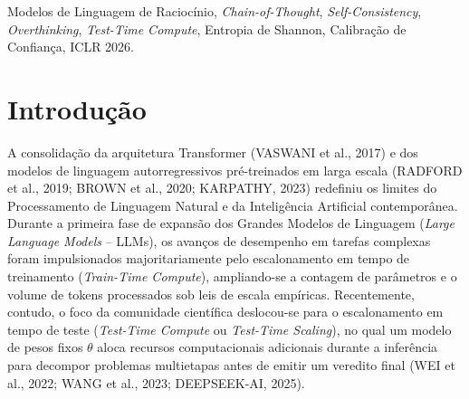 \documentclass[9pt,conference]{IEEEtran}
\begin{document}
\begin{abstract}
\vspace{2pt}
\noindent\textbf{\textit{Abstract}}---\textit{Test-Time Compute scaling via Chain-of-Thought (CoT) prompting and Self-Consistency (SC) voting has become the standard paradigm for enhancing mathematical reasoning in Large Language Models (LLMs). However, recent findings in ICLR 2026 reveal that in Small Language Models (SLMs, 1.5B--3B parameters), excessively long reasoning chains induce ``overthinking,'' where accuracy follows an inverted-U curve with respect to generation length $L$ (WU et al., 2026), driven by over-correction (HAO et al., 2026) and attention dilution (FENG et al., 2026). While calibrated scaling methods such as CaTS (HUANG et al., 2026) adaptively prune the sample budget $N$, they fail to bound intra-trace length $L$ online and suffer from severe miscalibration in long traces. We propose \textbf{Length-Calibrated Self-Consistency (LC-SC)}, an online decoding framework that jointly regulates the $N \times L$ inference matrix via token-level Shannon entropy monitoring, combining intra-trace $L$-Stopping, length-penalized calibrated voting, and inter-trace $N$-Stopping to advance the accuracy-compute Pareto frontier on GSM8K and MATH-500.}
\end{abstract}

\begin{IEEEkeywords}
Modelos de Linguagem de Racioc\'{i}nio, \textit{Chain-of-Thought}, \textit{Self-Consistency}, \textit{Overthinking}, \textit{Test-Time Compute}, Entropia de Shannon, Calibra\c{c}\~{a}o de Confian\c{c}a, ICLR 2026.
\end{IEEEkeywords}

\section{Introdu\c{c}\~{a}o}

A consolida\c{c}\~{a}o da arquitetura Transformer (VASWANI et al., 2017) e dos modelos de linguagem autorregressivos pr\'{e}-treinados em larga escala (RADFORD et al., 2019; BROWN et al., 2020; KARPATHY, 2023) redefiniu os limites do Processamento de Linguagem Natural e da Intelig\^{e}ncia Artificial contempor\^{a}nea. Durante a primeira fase de expans\~{a}o dos Grandes Modelos de Linguagem (\textit{Large Language Models} -- LLMs), os avan\c{c}os de desempenho em tarefas complexas foram impulsionados majoritariamente pelo escalonamento em tempo de treinamento (\textit{Train-Time Compute}), ampliando-se a contagem de par\^{a}metros e o volume de tokens processados sob leis de escala emp\'{i}ricas. Recentemente, contudo, o foco da comunidade cient\'{i}fica deslocou-se para o escalonamento em tempo de teste (\textit{Test-Time Compute} ou \textit{Test-Time Scaling}), no qual um modelo de pesos fixos $\theta$ aloca recursos computacionais adicionais durante a infer\^{e}ncia para decompor problemas multietapas antes de emitir um veredito final (WEI et al., 2022; WANG et al., 2023; DEEPSEEK-AI, 2025).
\end{document}
